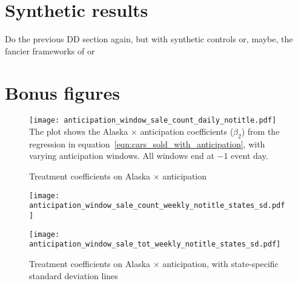\documentclass[11pt,letterpaper,oneside]{article}
\begin{document}
\section{Synthetic results}
Do the previous DD section again, but with synthetic controls or, maybe, the fancier frameworks of
\textcite{DoudchenkoImbens2016DD} or \textcite{Xu2016}




%
%





\pagebreak
\printbibliography



\appendix

\section{Bonus figures}

\begin{figure}[hbt]
    \caption{Treatment coefficients on Alaska $\times$ anticipation}
    \label{bonusfig:anticipation_window_sale_count_daily}
    \texttt{[image: anticipation\_window\_sale\_count\_daily\_notitle.pdf]}
    {\footnotesize
    The plot shows the Alaska $\times$ anticipation coefficients ($\beta_2$) from the regression in equation~\ref{eqn:cars_sold_with_anticipation}, with varying anticipation windows.
    All windows end at $-1$ event day.
    }
\end{figure}

\begin{figure}[hbt]
	\caption{Treatment coefficients on Alaska $\times$ anticipation, with state-specific standard deviation lines}
	\label{bonusfig:anticipation_window_sale_count_and_tot_weekly_states_sd}
	\texttt{[image: anticipation\_window\_sale\_count\_weekly\_notitle\_states\_sd.pdf]}

	\texttt{[image: anticipation\_window\_sale\_tot\_weekly\_notitle\_states\_sd.pdf]}
\end{figure}
\end{document}
